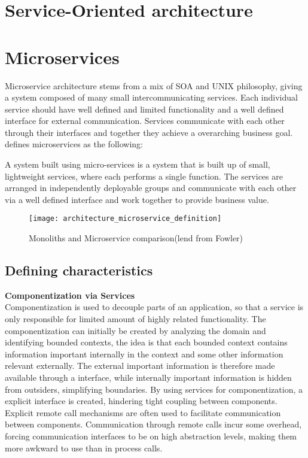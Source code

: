 \section{Service-Oriented architecture}


\section{Microservices}
Microservice architecture stems from a mix of SOA and UNIX philosophy, giving a system composed of many small intercommunicating services. Each individual service should have well defined and limited functionality and a well defined interface for external communication. Services communicate with each other through their interfaces and together they achieve a overarching business goal. \citeauthor{morgantini2013whatAreMicroServices} defines microservices as the following:

\begin{quote_highlight}
A system built using micro-services is a system that is built up of small, lightweight services, where each performs a single function. The services are arranged in independently deployable groups and communicate with each other via a well defined interface and work together to provide business value.\cite{morgantini2013whatAreMicroServices}
\end{quote_highlight}

\begin{figure}[!htb]
  \texttt{[image: architecture\_microservice\_definition]}  
  \caption{Monoliths and Microservice comparison(lend from Fowler)}
  \label{fig:architecture_microservice_definition}
\end{figure}

\subsection{Defining characteristics}
\textbf{Componentization via Services}\\
Componentization is used to decouple parts of an application, so that a service is only responsible for limited amount of highly related functionality\cite{morgantini2013whatAreMicroServices}. The componentization can initially be created by analyzing the domain and identifying bounded contexts\cite{newman2015microservices}, the idea is that each bounded context contains information important internally in the context and some other information relevant externally. The external important information is therefore made available through a interface, while internally important information is hidden from outsiders, simplifying boundaries.
By using services for componentization, a explicit interface is created, hindering tight coupling between components. Explicit remote call mechanisms are often used to facilitate communication between components. Communication through remote calls incur some overhead, forcing communication interfaces to be on high abstraction levels, making them more awkward to use than in process calls.

